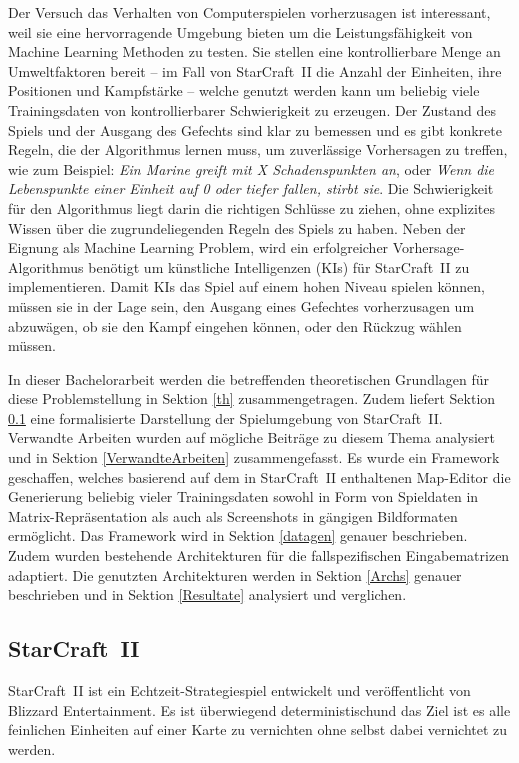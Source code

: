 Der Versuch das Verhalten von Computerspielen vorherzusagen ist interessant, weil sie eine hervorragende Umgebung bieten um die Leistungsfähigkeit von Machine Learning Methoden zu testen. Sie stellen eine kontrollierbare Menge an Umweltfaktoren bereit -- im Fall von StarCraft~II die Anzahl der Einheiten, ihre Positionen und Kampfstärke -- welche genutzt werden kann um beliebig viele Trainingsdaten von kontrollierbarer Schwierigkeit zu erzeugen. Der Zustand des Spiels und der Ausgang des Gefechts sind klar zu bemessen und es gibt konkrete Regeln, die der Algorithmus lernen muss, um zuverlässige Vorhersagen zu treffen, wie zum Beispiel: \textit{Ein Marine greift mit X Schadenspunkten an}, oder \textit{Wenn die Lebenspunkte einer Einheit auf 0 oder tiefer fallen, stirbt sie}. Die Schwierigkeit für den Algorithmus liegt darin die richtigen Schlüsse zu ziehen, ohne explizites Wissen über die zugrundeliegenden Regeln des Spiels zu haben. Neben der Eignung als Machine Learning Problem, wird ein erfolgreicher Vorhersage-Algorithmus benötigt um künstliche Intelligenzen (KIs) für StarCraft~II zu implementieren. Damit KIs das Spiel auf einem hohen Niveau spielen können, müssen sie in der Lage sein, den Ausgang eines Gefechtes vorherzusagen um abzuwägen, ob sie den Kampf eingehen können, oder den Rückzug wählen müssen. 

In dieser Bachelorarbeit werden die betreffenden theoretischen Grundlagen für diese Problemstellung in Sektion \ref{th} zusammengetragen. Zudem liefert Sektion \ref{SC2} eine formalisierte Darstellung der Spielumgebung von StarCraft~II. Verwandte Arbeiten wurden auf mögliche Beiträge zu diesem Thema analysiert und in Sektion \ref{VerwandteArbeiten} zusammengefasst. Es wurde ein Framework geschaffen, welches basierend auf dem in StarCraft~II enthaltenen Map-Editor die Generierung beliebig vieler Trainingsdaten sowohl in Form von Spieldaten in Matrix-Repräsentation als auch als Screenshots in gängigen Bildformaten ermöglicht. Das Framework wird in Sektion \ref{datagen} genauer beschrieben. Zudem wurden bestehende Architekturen für die fallspezifischen Eingabematrizen adaptiert. Die genutzten Architekturen werden in Sektion \ref{Archs} genauer beschrieben und in Sektion \ref{Resultate} analysiert und verglichen. 

\subsection{StarCraft~II}
\label{SC2}

StarCraft~II ist ein Echtzeit-Strategiespiel entwickelt und veröffentlicht von Blizzard Entertainment. Es ist überwiegend deterministisch\footnotemark und das Ziel ist es alle feinlichen Einheiten auf einer Karte zu vernichten ohne selbst dabei vernichtet zu werden.  

